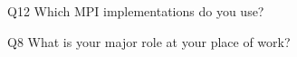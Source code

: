 \begin{description}%
\item{Q12} Which MPI implementations do you use?%
\item{Q8} What is your major role at your place of work?%
\end{description}%
